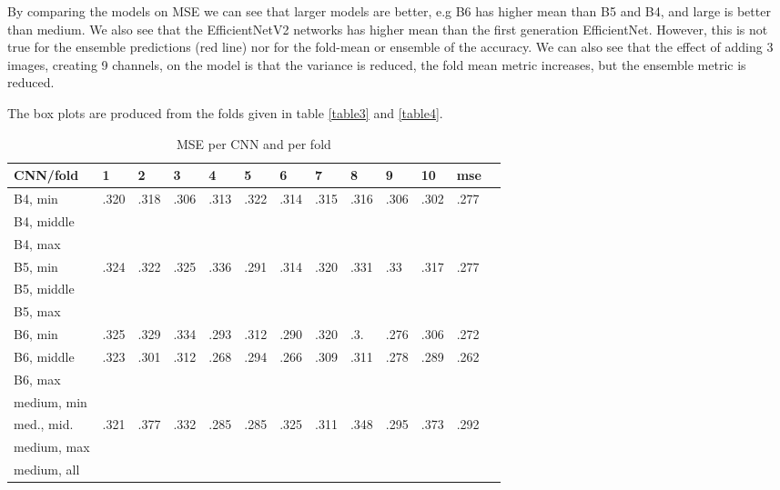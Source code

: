 \documentclass[10pt,letterpaper]{article}
\begin{document}
By comparing the models on MSE we can see that larger models are better, e.g B6 has 
higher mean than B5 and B4, and large is better than medium. 
We also see that the EfficientNetV2 networks has higher  mean than the
first generation EfficientNet. However, this is not true for the ensemble
predictions (red line) nor for the fold-mean or ensemble of the accuracy.
We can also see that the effect of adding 3 images, creating 9 channels, on the
model is that the variance is reduced, the fold mean metric increases,
but the ensemble metric is reduced.

The box plots are produced from the folds given in table \ref{table3} and \ref{table4}.
\begin{table}[!ht]
    \caption{MSE per CNN and per fold}
    \centering
    \begin{tabular}{|l|l|l|l|l|l|l|l|l|l|l|l|l|}
    \hline
        CNN/fold & 1 & 2 & 3 & 4 & 5 & 6 & 7 & 8 & 9 & 10 & mse \\ \hline
        B4, min & .320 & .318 & .306 & .313 & .322 & .314 & .315 & .316 & .306 & .302 & .277 \\ \hline
        B4, middle & ~ & ~ & ~ & ~ & ~ & ~ & ~ & ~ & ~ & ~ & ~ \\ \hline
        B4, max & ~ & ~ & ~ & ~ & ~ & ~ & ~ & ~ & ~ & ~ & ~ \\ \hline
        B5, min & .324 & .322 & .325 & .336 & .291 & .314 & .320 & .331 & .33 & .317 & .277 \\ \hline
        B5, middle & ~ & ~ & ~ & ~ & ~ & ~ & ~ & ~ & ~ & ~ & ~ \\ \hline
        B5, max & ~ & ~ & ~ & ~ & ~ & ~ & ~ & ~ & ~ & ~ & ~ \\ \hline
        B6, min & .325 & .329 & .334 & .293 & .312 & .290 & .320 & .3. & .276 & .306 & .272 \\ \hline
        B6, middle & .323 & .301 & .312 & .268 & .294 & .266 & .309 & .311 & .278 & .289 & .262 \\ \hline
        B6, max & ~ & ~ & ~ & ~ & ~ & ~ & ~ & ~ & ~ & ~ & ~ \\ \hline
        medium, min & ~ & ~ & ~ & ~ & ~ & ~ & ~ & ~ & ~ & ~ & ~ \\ \hline
        med., mid. & .321 & .377 & .332 & .285 & .285 & .325 & .311 & .348 & .295 & .373 & .292 \\ \hline
        medium, max & ~ & ~ & ~ & ~ & ~ & ~ & ~ & ~ & ~ & ~ & ~ \\ \hline
        medium, all & ~ & ~ & ~ & ~ & ~ & ~ & ~ & ~ & ~ & ~ & ~ \\ \hline

\end{tabular}
\end{table}
\end{document}
